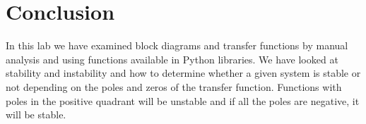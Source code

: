 \documentclass[12pt]{report}
\begin{document}
\hypertarget{conclusion}{%
\chapter{Conclusion}\label{conclusion}}

In this lab we have examined block diagrams and transfer functions by
manual analysis and using functions available in Python libraries. We
have looked at stability and instability and how to determine whether a
given system is stable or not depending on the poles and zeros of the
transfer function. Functions with poles in the positive quadrant will be
unstable and if all the poles are negative, it will be stable.


    
    
    
    
\end{document}
